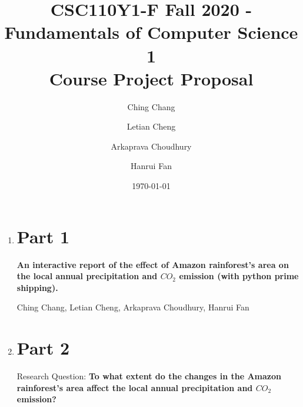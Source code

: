 \documentclass[12pt]{article}
\title{CSC110Y1-F Fall 2020 - Fundamentals of Computer Science 1 \\ Course Project Proposal}
\author{
  Ching Chang\\
  \and
  Letian Cheng\\
  \and
  Arkaprava Choudhury\\
  \and
  Hanrui Fan
}
\date{\today}
\begin{document}
\maketitle

\newpage


\begin{enumerate}
\item \section*{Part 1}
\textbf{An interactive report of the effect of Amazon rainforest's area on the local annual precipitation and $CO_2$ emission (with python prime shipping).}

Ching Chang, Letian Cheng, Arkaprava Choudhury, Hanrui Fan

\newpage

\item \section*{Part 2}

\begin{text}
Research Question: \textbf{To what extent do the changes in the Amazon rainforest’s area affect the local annual precipitation and $CO_2$ emission?}


\end{text}
\end{enumerate}
\end{document}
